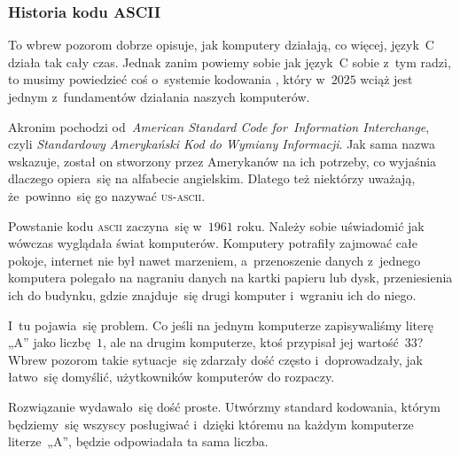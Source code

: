 \documentclass[10pt,t]{beamer}
\begin{document}
\begin{frame}
  \frametitle{Historia kodu ASCII}




  To wbrew pozorom dobrze opisuje, jak komputery działają, co więcej,
  język~C działa tak cały czas. Jednak zanim powiemy sobie jak język~C
  sobie z~tym radzi, to musimy powiedzieć coś o~systemie kodowania
  , który
  w~$2025$ wciąż jest jednym z~fundamentów działania naszych komputerów.

  Akronim 
  pochodzi od~\textit{American Standard Code for~Information Interchange},
  czyli \textit{Standardowy Amerykański Kod do Wymiany Informacji}.
  Jak sama nazwa wskazuje, został on stworzony przez Amerykanów na ich
  potrzeby, co wyjaśnia dlaczego opiera~się na alfabecie angielskim.
  Dlatego też niektórzy uważają, że~powinno~się go nazywać
  \textsc{us-ascii}.

  Powstanie kodu \textsc{ascii} zaczyna~się w~$1961$ roku. Należy sobie
  uświadomić jak wówczas wyglądała świat komputerów. Komputery potrafiły
  zajmować całe pokoje, internet nie był nawet marzeniem, a~przenoszenie
  danych z~jednego komputera polegało na nagraniu danych na kartki papieru
  lub dysk, przeniesienia ich do budynku, gdzie znajduje~się drugi komputer
  i~wgraniu ich do niego.

  I~tu pojawia~się problem. Co jeśli na jednym komputerze zapisywaliśmy
  literę „A” jako liczbę~$1$, ale na drugim komputerze, ktoś przypisał jej
  wartość~$33$? Wbrew pozorom takie sytuacje~się zdarzały dość często
  i~doprowadzały, jak łatwo~się domyślić, użytkowników komputerów do
  rozpaczy.

  Rozwiązanie wydawało~się dość proste. Utwórzmy standard kodowania, którym
  będziemy~się wszyscy posługiwać i~dzięki któremu na każdym komputerze
  literze~„A”, będzie odpowiadała ta sama liczba.

\end{frame}
\end{document}
